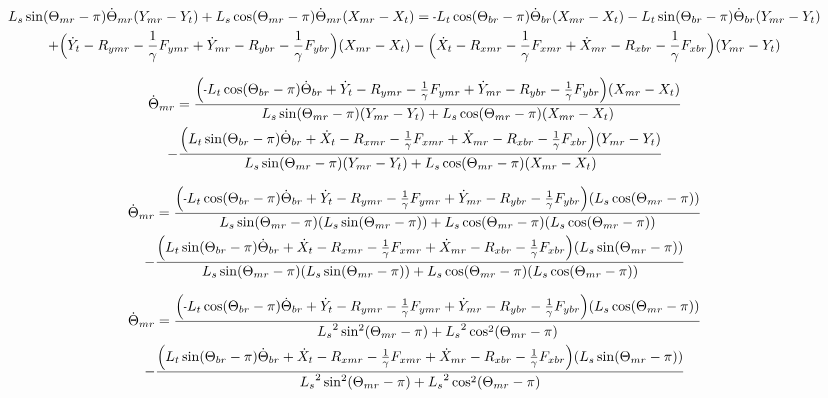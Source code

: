 \documentclass[11pt, landscape]{article}
\newcommand{\mn}{\scalebox{0.7}[1.0]{-}}
\begin{document}
\begin{multline}
L_{s}\sin(\Theta_{mr}-\pi) \dot{\Theta}_{mr} (Y_{mr} - Y_{t }) + L_{s}\cos(\Theta_{mr}-\pi) \dot{\Theta}_{mr} (X_{mr} - X_{t }) =
\mn L_{t}\cos(\Theta_{br}-\pi) \dot{\Theta}_{br} (X_{mr} - X_{t }) - L_{t}\sin(\Theta_{br}-\pi) \dot{\Theta}_{br} (Y_{mr} - Y_{t }) \\
+ \Big ( \dot{Y}_{t } - R_{ymr} - \frac{1}{\gamma}F_{ymr} + \dot{Y}_{mr} - R_{ybr} - \frac{1}{\gamma}F_{ybr} \Big ) (X_{mr} - X_{t }) 
- \Big ( \dot{X}_{t } - R_{xmr} - \frac{1}{\gamma}F_{xmr} + \dot{X}_{mr} - R_{xbr} - \frac{1}{\gamma}F_{xbr} \Big ) (Y_{mr} - Y_{t })
\end{multline}

\begin{multline}
\dot{\Theta}_{mr} =
\frac{\Big( \mn L_{t}\cos(\Theta_{br}-\pi) \dot{\Theta}_{br} + \dot{Y}_{t } - R_{ymr} - \frac{1}{\gamma}F_{ymr} + \dot{Y}_{mr} -R_{ybr} - \frac{1}{\gamma}F_{ybr}\Big) (X_{mr} - X_{t })}
{L_{s}\sin(\Theta_{mr}-\pi)(Y_{mr} - Y_{t}) + L_{s}\cos(\Theta_{mr}-\pi)(X_{mr} - X_{t })} \\
  - \frac{\Big(L_{t}\sin(\Theta_{br}-\pi) \dot{\Theta}_{br} + \dot{X}_{t } - R_{xmr} - \frac{1}{\gamma}F_{xmr} + \dot{X}_{mr} - R_{xbr} -\frac{1}{\gamma}F_{xbr} \Big)(Y_{mr} - Y_{t })}
  {L_{s}\sin(\Theta_{mr}-\pi)(Y_{mr} - Y_{t }) + L_{s}\cos(\Theta_{mr}-\pi)(X_{mr} - X_{t })}
\end{multline}

\begin{multline}
\dot{\Theta}_{mr} =
\frac{\Big( \mn L_{t}\cos(\Theta_{br}-\pi) \dot{\Theta}_{br} + \dot{Y}_{t } - R_{ymr} - \frac{1}{\gamma}F_{ymr} + \dot{Y}_{mr} -R_{ybr} - \frac{1}{\gamma}F_{ybr}\Big) (L_{s}\cos(\Theta_{mr}-\pi))}
{L_{s}\sin(\Theta_{mr}-\pi)(L_{s}\sin(\Theta_{mr}-\pi)) + L_{s}\cos(\Theta_{mr}-\pi)(L_{s}\cos(\Theta_{mr}-\pi))} \\
  - \frac{\Big(L_{t}\sin(\Theta_{br}-\pi) \dot{\Theta}_{br} + \dot{X}_{t } - R_{xmr} - \frac{1}{\gamma}F_{xmr} + \dot{X}_{mr} - R_{xbr} -\frac{1}{\gamma}F_{xbr} \Big)(L_{s}\sin(\Theta_{mr}-\pi))}
  {L_{s}\sin(\Theta_{mr}-\pi)(L_{s}\sin(\Theta_{mr}-\pi)) + L_{s}\cos(\Theta_{mr}-\pi)(L_{s}\cos(\Theta_{mr}-\pi))}
\end{multline}

\begin{multline}
\dot{\Theta}_{mr} =
\frac{\Big( \mn L_{t}\cos(\Theta_{br}-\pi) \dot{\Theta}_{br} + \dot{Y}_{t } - R_{ymr} - \frac{1}{\gamma}F_{ymr} + \dot{Y}_{mr} -R_{ybr} - \frac{1}{\gamma}F_{ybr}\Big) (L_{s}\cos(\Theta_{mr}-\pi))}
{{L_{s}}^2\sin^2(\Theta_{mr}-\pi) + {L_{s}}^2\cos^2(\Theta_{mr}-\pi)} \\
  - \frac{\Big(L_{t}\sin(\Theta_{br}-\pi) \dot{\Theta}_{br} + \dot{X}_{t } - R_{xmr} - \frac{1}{\gamma}F_{xmr} + \dot{X}_{mr} - R_{xbr} -\frac{1}{\gamma}F_{xbr} \Big)(L_{s}\sin(\Theta_{mr}-\pi))}
  {{L_{s}}^2\sin^2(\Theta_{mr}-\pi) + {L_{s}}^2\cos^2(\Theta_{mr}-\pi)}
\end{multline}
\end{document}
